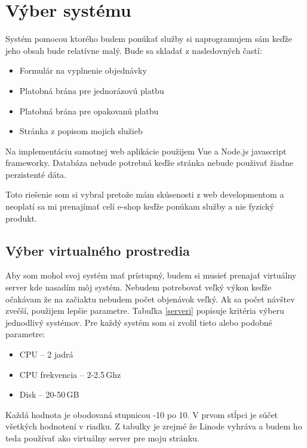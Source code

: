 \chapter{Výber systému}

Systém pomocou ktorého budem ponúkať služby si naprogramujem sám keďže jeho obsah bude relatívne malý. Bude sa skladať z nasledovných častí:

\begin{itemize}
  \item Formulár na vyplnenie objednávky
  \item Platobná brána pre jednorázovú platbu
  \item Platobná brána pre opakovanú platbu
  \item Stránka z popisom mojich služieb
\end{itemize}

Na implementáciu samotnej web aplikácie použijem Vue \cite{vue} a Node.js \cite{Node} javascript frameworky. Databáza nebude potrebná keďže stránka nebude použivať žiadne perzistenté dáta.

Toto riešenie som si vybral pretože mám skúsenosti z web developmentom a neoplatí sa mi prenajímať celí e-shop keďže ponúkam služby a nie fyzický produkt.

\section{Výber virtualného prostredia}
\label{vyber}

Aby som mohol svoj systém mať prístupný, budem si musieť prenajať virtuálny server kde nasadím môj systém. Nebudem potrebovať veľký výkon keďže očakávam že na začiaktu nebudem počet objenávok veľký. Ak sa počet návštev zvečší, použijem lepšie parametre. Tabuľka \ref{serveri} popisuje kritéria výberu jednodlivý systémov. Pre každý systém som si zvolil tieto alebo podobné parametre:

\begin{itemize}
  \item CPU -- 2 jadrá
  \item CPU frekvencia -- 2-2.5\,Ghz
  \item Disk -- 20-50\,GB
\end{itemize}
Každá hodnota je obodovaná stupnicou -10 po 10. V prvom stĺpci je súčet všetkých hodnotení v riadku. Z tabulky je zrejmé že Linode vyhráva a budem ho teda používať ako virtuálny server pre moju stránku.


